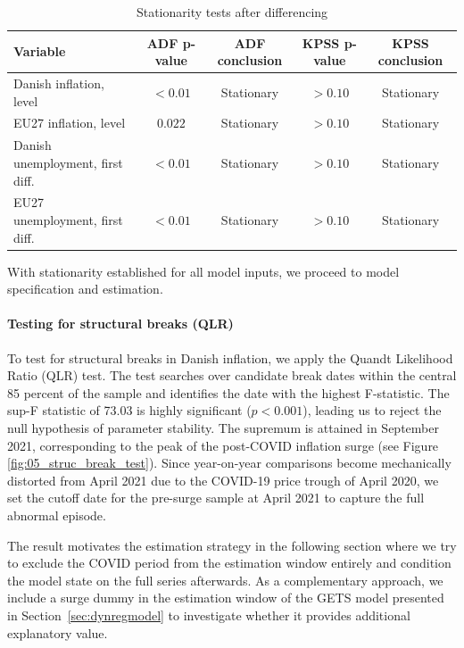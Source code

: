 \begin{table}[H]
\centering
\small
\caption{Stationarity tests after differencing}
\label{tab:stationarity_tests}
\begin{tabular*}{\textwidth}{@{\extracolsep{\fill}}lcccc}
\hline \hline
\rule{0pt}{12pt}\textbf{Variable} & \textbf{ADF p-value} & \textbf{ADF conclusion} & \textbf{KPSS p-value} & \textbf{KPSS conclusion} \\ [3pt]
\hline
\rule{0pt}{12pt}Danish inflation, level          & $<0.01$ & Stationary & $>0.10$ & Stationary \\ [3pt]
\rule{0pt}{12pt}EU27 inflation, level            & $0.022$ & Stationary & $>0.10$ & Stationary \\ [3pt]
\rule{0pt}{12pt}Danish unemployment, first diff. & $<0.01$ & Stationary & $>0.10$ & Stationary \\ [3pt]
\rule{0pt}{12pt}EU27 unemployment, first diff.   & $<0.01$ & Stationary & $>0.10$ & Stationary \\ [3pt]
\hline \hline
\end{tabular*}
\end{table}

With stationarity established for all model inputs, we proceed to model specification and estimation.

\paragraph{Testing for structural breaks (QLR)}\label{sec:QLR}
To test for structural breaks in Danish inflation, we apply the Quandt Likelihood Ratio (QLR) test. The test searches over candidate break dates within the central 85 percent of the sample and identifies the date with the highest F-statistic. The sup-F statistic of 73.03 is highly significant ($p < 0.001$), leading us to reject the null hypothesis of parameter stability. The supremum is attained in September 2021, corresponding to the peak of the post-COVID inflation surge (see Figure \ref{fig:05_struc_break_test}). Since year-on-year comparisons become mechanically distorted from April 2021 due to the COVID-19 price trough of April 2020, we set the cutoff date for the pre-surge sample at April 2021 to capture the full abnormal episode.

The result motivates the estimation strategy in the following section where we try to exclude the COVID period from the estimation window entirely and condition the model state on the full series afterwards. As a complementary approach, we include a surge dummy in the estimation window of the GETS model presented in Section~\ref{sec:dynregmodel} to investigate whether it provides additional explanatory value.

